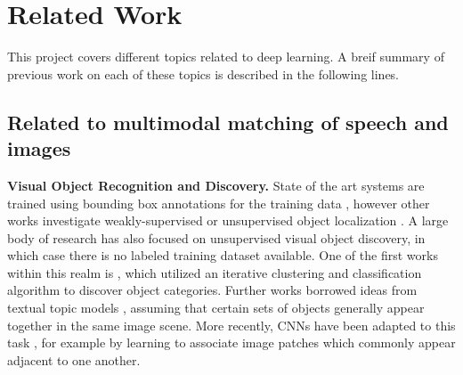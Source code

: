 \chapter{Related Work}
\label{chapter:related_work}

This project covers different topics related to deep learning. A breif summary of previous work on each of these topics is described in the following lines.

\section{Related to multimodal matching of speech and images}
\textbf{Visual Object Recognition and Discovery.} 
State of the art systems are trained using bounding box annotations for the training data \cite{girshick_2013,yolo}, however other works investigate weakly-supervised or unsupervised object localization \cite{bergamo_2014,cho_2015,cinbis_2016,zhou_2015}. A large body of research has also focused on unsupervised visual object discovery, in which case there is no labeled training dataset available. One of the first works within this realm is \cite{weber_2000}, which utilized an iterative clustering and classification algorithm to discover object categories. Further works borrowed ideas from textual topic models \cite{russell_2006}, assuming that certain sets of objects generally appear together in the same image scene. More recently, CNNs have been adapted to this task \cite{doersch_2015,guerin_2017}, for example by learning to associate image patches which commonly appear adjacent to one another. 

